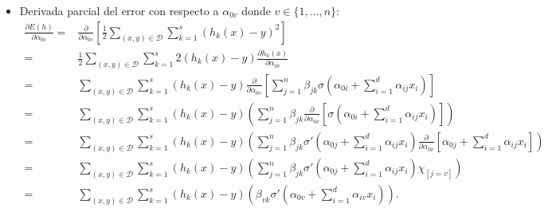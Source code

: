 \begin{itemize}
    \item Derivada parcial del error con respecto a $\alpha_{0 v}$ donde $v \in \{1, \ldots, n\}$:
    \begin{align} \label{eq:parcial_alpha_cero}
        \frac{\partial E(h)}{\partial \alpha_{0 v}} 
        = &
        \frac{\partial}{\partial \alpha_{0 v}}
        \left[
            \frac{1}{2}
            \sum_{(x,y) \in \mathcal{D}}
            \sum_{k = 1}^s 
            \left(h_k(x) - y\right)^2
        \right]
        \\ %
        = &
        \frac{1}{2}
        \sum_{(x,y) \in \mathcal{D}}
        \sum_{k = 1}^s 
        2 \left(h_k(x) - y\right)
        \frac{\partial h_k(x)}{\partial \alpha_{0 v}} 
        \\ 
        = & %
        \sum_{(x,y) \in \mathcal{D}}
        \sum_{k = 1}^s 
        \left(h_k(x) - y\right)
        \frac{\partial}{\partial \alpha_{0 v}} 
        \left[
            \sum_{j = 1}^n 
                \beta_{j k}
                \sigma
                \left(  
                    \alpha_{0 i} +
                    \sum_{i=1}^d \alpha_{i j}x_i
                \right)
        \right] 
        \\ 
        = & %
        \sum_{(x,y) \in \mathcal{D}}
        \sum_{k = 1}^s 
        \left(h_k(x) - y\right)
        \left(
            \sum_{j = 1}^n 
            \beta_{j k}
            \frac{\partial}{\partial \alpha_{0 v}} 
            \left[
                \sigma
                \left(  
                    \alpha_{0 i} +
                    \sum_{i=1}^d \alpha_{i j}x_i
                \right)
            \right]
        \right) 
        \\ 
        = & %
        \sum_{(x,y) \in \mathcal{D}}
        \sum_{k = 1}^s 
        \left(h_k(x) - y\right)
        \left(
            \sum_{j = 1}^n 
            \beta_{j k}
            \sigma '
            \left(  
                \alpha_{0 j} +
                \sum_{i=1}^d \alpha_{i j}x_i
            \right)
            \frac{\partial}{\partial \alpha_{0 v}}    
            \left[
                \alpha_{0 j} +
                \sum_{i=1}^d \alpha_{i j}x_i
            \right]
        \right) 
        \\ 
        = & %
        \sum_{(x,y) \in \mathcal{D}}
        \sum_{k = 1}^s 
        \left(h_k(x) - y\right)
        \left(
            \sum_{j = 1}^n 
            \beta_{j k}
            \sigma '
            \left(  
                \alpha_{0 j} +
                \sum_{i=1}^d \alpha_{i j}x_i
            \right)   
            \chi_{[j = v]}
        \right) 
        \\ 
        = & %
        \sum_{(x,y) \in \mathcal{D}}
        \sum_{k = 1}^s 
        \left(h_k(x) - y\right)
        \left(
            \beta_{v k}
            \sigma '
            \left(  
                \alpha_{0 v} +
                \sum_{i=1}^d \alpha_{i v}x_i
            \right)   
        \right). 
    \end{align}


\end{itemize}
